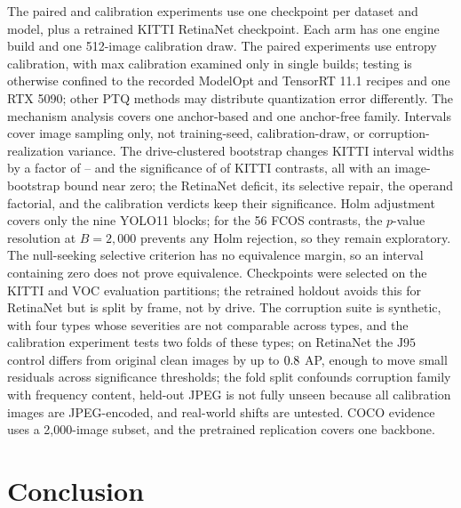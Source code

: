 \documentclass[a4paper,fleqn]{cas-dc}
\newcommand{\Jclean}{\mathrm{J95}}
\begin{document}
The paired and calibration experiments use one checkpoint per dataset and model, plus a retrained KITTI RetinaNet checkpoint. Each arm has one engine build and one 512-image calibration draw. The paired experiments use entropy calibration, with max calibration examined only in single builds; testing is otherwise confined to the recorded ModelOpt and TensorRT 11.1 recipes and one RTX 5090; other PTQ methods may distribute quantization error differently. The mechanism analysis covers one anchor-based and one anchor-free family. Intervals cover image sampling only, not training-seed, calibration-draw, or corruption-realization variance. The drive-clustered bootstrap changes KITTI interval widths by a factor of \nnClWidthMin--\nnClWidthMax{} and the significance of \nnClChanged{} of \nnClClaims{} KITTI contrasts, all with an image-bootstrap bound near zero; the RetinaNet deficit, its selective repair, the operand factorial, and the calibration verdicts keep their significance. Holm adjustment covers only the nine YOLO11 blocks; for the 56 FCOS contrasts, the $p$-value resolution at $B=2{,}000$ prevents any Holm rejection, so they remain exploratory. The null-seeking selective criterion has no equivalence margin, so an interval containing zero does not prove equivalence. Checkpoints were selected on the KITTI and VOC evaluation partitions; the retrained holdout avoids this for RetinaNet but is split by frame, not by drive. The corruption suite is synthetic, with four types whose severities are not comparable across types, and the calibration experiment tests two folds of these types; on RetinaNet the $\Jclean$ control differs from original clean images by up to $0.8$ AP, enough to move small residuals across significance thresholds; the fold split confounds corruption family with frequency content, held-out JPEG is not fully unseen because all calibration images are JPEG-encoded, and real-world shifts are untested. COCO evidence uses a 2,000-image subset, and the pretrained replication covers one backbone.

\section{Conclusion}
\label{sec:conclusion}
\end{document}
